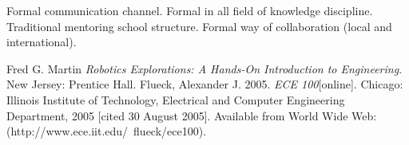 \documentclass[a4paper, 11pt]{article}
\begin{document}
Formal communication channel. Formal in all field of knowledge discipline. Traditional mentoring school structure. Formal way of collaboration (local and international).



\begin{thebibliography}{9}
 Fred G. Martin \emph{Robotics Explorations: A Hands-On Introduction to Engineering}. New Jersey: Prentice Hall.
  Flueck, Alexander J. 2005. \emph{ECE 100}[online]. Chicago: Illinois Institute of Technology, Electrical and Computer Engineering Department, 2005 [cited 30
August 2005]. Available from World Wide Web: (http://www.ece.iit.edu/~flueck/ece100).
\end{thebibliography}
\end{document}

